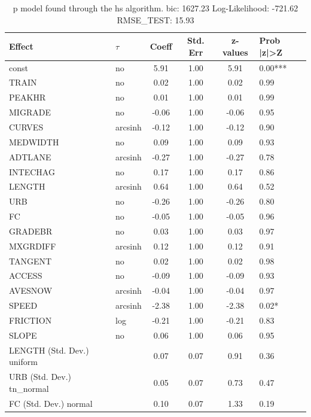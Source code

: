\begin{table}
	\caption{p model found through the hs algorithm. bic: 1627.23 Log-Likelihood: -721.62 RMSE_TEST: 15.93}
	\begin{center}
		\begin{tabular}{|l|l|c|c|c|l|}
			\hline
			Effect & $\tau$ & Coeff & Std. Err & z-values & Prob |z|>Z \\
			\hline
			const & no & 5.91 & 1.00 & 5.91 & 0.00*** \\
			\hline
			TRAIN & no & 0.02 & 1.00 & 0.02 & 0.99 \\
			\hline
			PEAKHR & no & 0.01 & 1.00 & 0.01 & 0.99 \\
			\hline
			MIGRADE & no & -0.06 & 1.00 & -0.06 & 0.95 \\
			\hline
			CURVES & arcsinh & -0.12 & 1.00 & -0.12 & 0.90 \\
			\hline
			MEDWIDTH & no & 0.09 & 1.00 & 0.09 & 0.93 \\
			\hline
			ADTLANE & arcsinh & -0.27 & 1.00 & -0.27 & 0.78 \\
			\hline
			INTECHAG & no & 0.17 & 1.00 & 0.17 & 0.86 \\
			\hline
			LENGTH & arcsinh & 0.64 & 1.00 & 0.64 & 0.52 \\
			\hline
			URB & no & -0.26 & 1.00 & -0.26 & 0.80 \\
			\hline
			FC & no & -0.05 & 1.00 & -0.05 & 0.96 \\
			\hline
			GRADEBR & no & 0.03 & 1.00 & 0.03 & 0.97 \\
			\hline
			MXGRDIFF & arcsinh & 0.12 & 1.00 & 0.12 & 0.91 \\
			\hline
			TANGENT & no & 0.02 & 1.00 & 0.02 & 0.98 \\
			\hline
			ACCESS & no & -0.09 & 1.00 & -0.09 & 0.93 \\
			\hline
			AVESNOW & arcsinh & -0.04 & 1.00 & -0.04 & 0.97 \\
			\hline
			SPEED & arcsinh & -2.38 & 1.00 & -2.38 & 0.02* \\
			\hline
			FRICTION & log & -0.21 & 1.00 & -0.21 & 0.83 \\
			\hline
			SLOPE & no & 0.06 & 1.00 & 0.06 & 0.95 \\
			\hline
			LENGTH (Std. Dev.) uniform &  & 0.07 & 0.07 & 0.91 & 0.36 \\
			\hline
			URB (Std. Dev.) tn_normal &  & 0.05 & 0.07 & 0.73 & 0.47 \\
			\hline
			FC (Std. Dev.) normal &  & 0.10 & 0.07 & 1.33 & 0.19 \\

\end{tabular}
\end{center}
\end{table}
